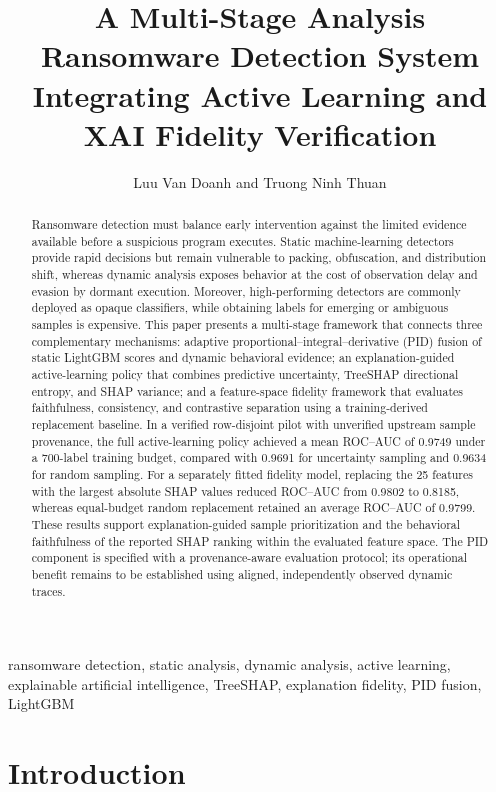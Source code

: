 \documentclass{IEEEtran}
\title{A Multi-Stage Analysis Ransomware Detection System\protect\\
Integrating Active Learning and XAI Fidelity Verification}
\author{Luu Van Doanh and Truong Ninh Thuan}
\begin{document}
\maketitle

\begin{abstract}
Ransomware detection must balance early intervention against the limited evidence available before a suspicious program executes. Static machine-learning detectors provide rapid decisions but remain vulnerable to packing, obfuscation, and distribution shift, whereas dynamic analysis exposes behavior at the cost of observation delay and evasion by dormant execution. Moreover, high-performing detectors are commonly deployed as opaque classifiers, while obtaining labels for emerging or ambiguous samples is expensive. This paper presents a multi-stage framework that connects three complementary mechanisms: adaptive proportional--integral--derivative (PID) fusion of static LightGBM scores and dynamic behavioral evidence; an explanation-guided active-learning policy that combines predictive uncertainty, TreeSHAP directional entropy, and SHAP variance; and a feature-space fidelity framework that evaluates faithfulness, consistency, and contrastive separation using a training-derived replacement baseline. In a verified row-disjoint pilot with unverified upstream sample provenance, the full active-learning policy achieved a mean ROC--AUC of 0.9749 under a 700-label training budget, compared with 0.9691 for uncertainty sampling and 0.9634 for random sampling. For a separately fitted fidelity model, replacing the 25 features with the largest absolute SHAP values reduced ROC--AUC from 0.9802 to 0.8185, whereas equal-budget random replacement retained an average ROC--AUC of 0.9799. These results support explanation-guided sample prioritization and the behavioral faithfulness of the reported SHAP ranking within the evaluated feature space. The PID component is specified with a provenance-aware evaluation protocol; its operational benefit remains to be established using aligned, independently observed dynamic traces.
\end{abstract}

\begin{IEEEkeywords}
ransomware detection, static analysis, dynamic analysis, active learning, explainable artificial intelligence, TreeSHAP, explanation fidelity, PID fusion, LightGBM
\end{IEEEkeywords}

\section{Introduction}
\label{sec:introduction}
\end{document}
